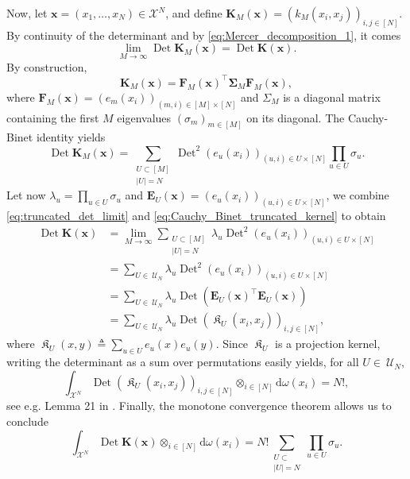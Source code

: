 \documentclass[twoside,11pt]{book}
\DeclareMathOperator{\Det}{Det}
\DeclareMathOperator{\Tran}{\intercal}
\DeclareMathOperator*{\KDPP}{\mathfrak{K}}
\DeclareMathOperator{\X}{\mathcal{X}}
\DeclareMathOperator{\Ns}{\mathbb{N}^{*}}
\def\UN{\:\mathcal{U}_N}
\begin{document}
Now, let $\bm{x} = (x_{1}, \dots, x_{N}) \in \mathcal{X}^{N}$, and define
$\bm{K}_{M}(\bm{x}) = (k_{M}(x_{i},x_{j}))_{i,j \in [N]}$. By continuity of the determinant and by \eqref{eq:Mercer_decomposition_1}, it comes
\begin{equation}\label{eq:truncated_det_limit}
  \lim\limits_{M \rightarrow \infty} \Det \bm{K}_{M}(\bm{x}) = \Det \bm{K}(\bm{x}).
\end{equation}
By construction,
\begin{equation}
  \bm{K}_{M}(\bm{x}) = \bm{F}_{M}(\bm{x})^{\Tran}\bm{\Sigma}_{M}\bm{F}_{M}(\bm{x}),
\end{equation}
where $\bm{F}_{M}(\bm{x}) = (e_{m}(x_{i}))_{(m,i) \in [M]\times[N]}$ and $\Sigma_{M}$ is a diagonal matrix containing the first $M$ eigenvalues $(\sigma_{m})_{m\in[M]}$ on its diagonal. The Cauchy-Binet identity yields
\begin{equation}\label{eq:Cauchy_Binet_truncated_kernel}
  \Det \bm{K}_{M}(\bm{x})  = \sum\limits_{\substack{U \subset [M]\\ |U| = N}} \Det^{2} (e_{u}(x_{i}))_{(u,i)\in U \times [N]} \prod\limits_{u \in U} \sigma_{u}.
\end{equation}
Let now $\lambda_u= \prod_{u \in U} \sigma_{u}$ and $\bm{E}_{U}(\bm{x}) = (e_{u}(x_{i}))_{(u,i)\in U \times [N]}$,
we combine \eqref{eq:truncated_det_limit} and \eqref{eq:Cauchy_Binet_truncated_kernel} to obtain
\begin{align}
\Det \bm{K}(\bm{x}) & = \lim\limits_{M \rightarrow \infty} \sum_{\substack{U \subset [M]\\ |U| = N}} \lambda_u \Det^{2} (e_{u}(x_{i}))_{(u,i)\in U \times [N]}  \\
&= \sum_{U\in \UN} \lambda_u \Det^{2} (e_{u}(x_{i}))_{(u,i)\in U \times [N]}\\
&= \sum_{U\in \UN} \lambda_u \Det \left( \bm{E}_{U}(\bm{x})^{\Tran} \bm{E}_{U}(\bm{x}) \right)\\
&= \sum_{U\in \UN} \lambda_u \Det ({\KDPP}_{U}(x_{i},x_{j}))_{i,j \in [N]},
\end{align}
where ${\KDPP}_{U}(x,y) \triangleq \sum_{u\in U} e_u(x)e_u(y)$. Since ${\KDPP}_{U}$ is a projection kernel, writing the determinant as a sum over permutations easily yields, for all $U\in\UN$,
\begin{equation}
\int_{\X^{N}} \Det({\KDPP}_{U}(x_{i},x_{j}))_{i,j \in [N]} \otimes_{i \in [N]} \mathrm{d}\omega(x_{i}) = N!,
\end{equation}
see e.g. Lemma 21 in \citep{HoKrPeVi06}. Finally, the monotone convergence theorem allows us to conclude
\begin{equation}
\int_{\X^{N}} \Det \bm{K}(\bm{x}) \otimes_{i \in [N]} \mathrm{d}\omega(x_{i}) = N! \sum\limits_{\substack{U \subset \Ns\\ |U| = N}} \prod\limits_{u \in U } \sigma_{u}.
\end{equation}
\end{document}
